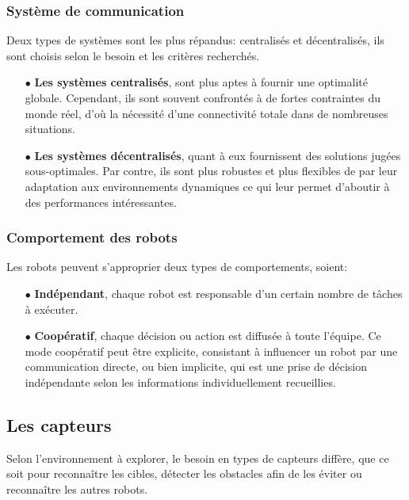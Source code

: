 \subsubsection{Système de communication \cite{surv2}}
Deux types de systèmes sont les plus répandus: centralisés et décentralisés, ils sont choisis selon le besoin et les critères recherchés.


\begin{itemize}  
	\item[$\bullet$] \textbf{Les systèmes centralisés}, sont plus aptes à fournir une optimalité globale. Cependant, ils sont souvent confrontés à de fortes contraintes du  monde réel, d’où la nécessité d'une connectivité totale dans de nombreuses situations.
	
	\item[$\bullet$] \textbf{Les systèmes décentralisés}, quant à eux fournissent des solutions jugées sous-optimales. Par contre, ils sont plus robustes et plus flexibles de par leur adaptation aux environnements dynamiques ce qui leur permet d'aboutir à des performances intéressantes.
\end{itemize}


\subsubsection{Comportement des robots \cite{surv2}}
Les robots peuvent s'approprier deux types de comportements, soient:

\begin{itemize} 
	\item[$\bullet$] \textbf{Indépendant}, chaque robot est responsable d'un certain nombre de tâches à exécuter.
	
	\item[$\bullet$] \textbf{Coopératif}, chaque décision ou action est diffusée à toute l'équipe. Ce mode coopératif peut être explicite, consistant à influencer un robot par une communication directe, ou bien implicite, qui est une  prise de décision indépendante selon les informations individuellement recueillies.
\end{itemize}


\subsection{Les capteurs}
Selon l'environnement à explorer, le besoin en types de capteurs diffère, que ce soit pour reconnaître les cibles, détecter les obstacles afin de les éviter ou reconnaître les autres robots.

